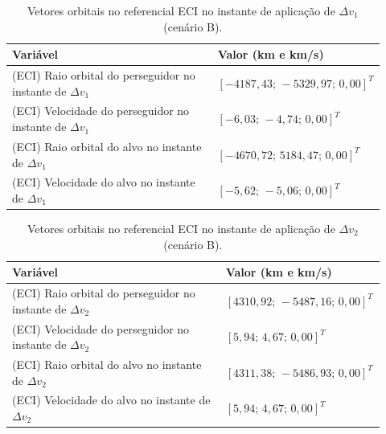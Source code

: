 \begin{table}[H]
\centering
\caption{Vetores orbitais no referencial ECI no instante de aplicação de $\Delta v_1$ (cenário B).}
\label{tab_cap4_eciB_dv1}
\begingroup
\small
\setlength{\tabcolsep}{4pt}
\renewcommand{\arraystretch}{1.15}
\begin{tabular}{|p{0.58\linewidth}|p{0.34\linewidth}|}
\hline
Variável & Valor (km e km/s)\\
\hline
(ECI) Raio orbital do perseguidor no instante de $\Delta v_1$ &
$\left[-4187,43;\,-5329,97;\,0,00\right]^T$\\
\hline
(ECI) Velocidade do perseguidor no instante de $\Delta v_1$ &
$\left[-6,03;\,-4,74;\,0,00\right]^T$\\
\hline
(ECI) Raio orbital do alvo no instante de $\Delta v_1$ &
$\left[-4670,72;\,5184,47;\,0,00\right]^T$\\
\hline
(ECI) Velocidade do alvo no instante de $\Delta v_1$ &
$\left[-5,62;\,-5,06;\,0,00\right]^T$\\
\hline
\end{tabular}
\endgroup
\end{table}

\begin{table}[H]
\centering
\caption{Vetores orbitais no referencial ECI no instante de aplicação de $\Delta v_2$ (cenário B).}
\label{tab_cap4_eciB_dv2}
\begingroup
\small
\setlength{\tabcolsep}{4pt}
\renewcommand{\arraystretch}{1.15}
\begin{tabular}{|p{0.58\linewidth}|p{0.34\linewidth}|}
\hline
Variável & Valor (km e km/s)\\
\hline
(ECI) Raio orbital do perseguidor no instante de $\Delta v_2$ &
$\left[4310,92;\,-5487,16;\,0,00\right]^T$\\
\hline
(ECI) Velocidade do perseguidor no instante de $\Delta v_2$ &
$\left[5,94;\,4,67;\,0,00\right]^T$\\
\hline
(ECI) Raio orbital do alvo no instante de $\Delta v_2$ &
$\left[4311,38;\,-5486,93;\,0,00\right]^T$\\
\hline
(ECI) Velocidade do alvo no instante de $\Delta v_2$ &
$\left[5,94;\,4,67;\,0,00\right]^T$\\
\hline
\end{tabular}
\endgroup
\end{table}

